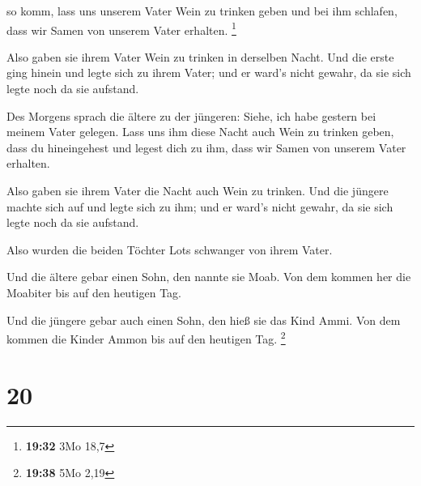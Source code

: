  so komm, lass uns unserem Vater Wein zu trinken geben
und bei ihm schlafen, dass wir Samen von unserem Vater erhalten.
\footnote{\textbf{19:32} 3Mo 18,7}

 Also gaben sie ihrem Vater Wein zu trinken in derselben
Nacht. Und die erste ging hinein und legte sich zu ihrem Vater; und er
ward's nicht gewahr, da sie sich legte noch da sie aufstand.

 Des Morgens sprach die ältere zu der jüngeren: Siehe,
ich habe gestern bei meinem Vater gelegen. Lass uns ihm diese Nacht auch
Wein zu trinken geben, dass du hineingehest und legest dich zu ihm, dass
wir Samen von unserem Vater erhalten.

 Also gaben sie ihrem Vater die Nacht auch Wein zu
trinken. Und die jüngere machte sich auf und legte sich zu ihm; und er
ward's nicht gewahr, da sie sich legte noch da sie aufstand.

 Also wurden die beiden Töchter Lots schwanger von ihrem
Vater.

 Und die ältere gebar einen Sohn, den nannte sie Moab.
Von dem kommen her die Moabiter bis auf den heutigen Tag.

 Und die jüngere gebar auch einen Sohn, den hieß sie das
Kind Ammi. Von dem kommen die Kinder Ammon bis auf den heutigen Tag.
\footnote{\textbf{19:38} 5Mo 2,19}

\hypertarget{section-4}{%
\section{20}\label{section-4}}

